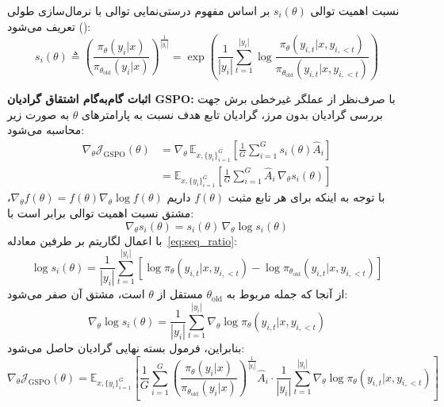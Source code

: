 نسبت اهمیت توالی $s_i(\theta)$ بر اساس مفهوم درستی‌نمایی توالی با نرمال‌سازی طولی () \cite{zheng2023click} تعریف می‌شود:
\begin{equation}
    \label{eq:seq_ratio}
    s_i(\theta) \triangleq \left( \frac{\pi_\theta(y_i|x)}{\pi_{\theta_{\text{old}}}(y_i|x)} \right)^{\frac{1}{|y_i|}} = \exp \left( \frac{1}{|y_i|} \sum_{t=1}^{|y_i|} \log \frac{\pi_\theta(y_{i,t} | x, y_{i,<t})}{\pi_{\theta_{\text{old}}}(y_{i,t} | x, y_{i,<t})} \right)
\end{equation}

\textbf{اثبات گام‌به‌گام اشتقاق گرادیان GSPO:}
با صرف‌نظر از عملگر غیرخطی برش جهت بررسی گرادیان بدون مرز، گرادیان تابع هدف نسبت به پارامترهای $\theta$ به صورت زیر محاسبه می‌شود:
\begin{align}
    \nabla_\theta \mathcal{J}_{\text{GSPO}}(\theta) &= \nabla_\theta \, \mathbb{E}_{x, \{y_i\}_{i=1}^G} \left[ \frac{1}{G} \sum_{i=1}^G s_i(\theta) \hat{A}_i \right] \nonumber \\
    &= \mathbb{E}_{x, \{y_i\}_{i=1}^G} \left[ \frac{1}{G} \sum_{i=1}^G \hat{A}_i \, \nabla_\theta s_i(\theta) \right]
\end{align}
با توجه به اینکه برای هر تابع مثبت $f(\theta)$ داریم $\nabla_\theta f(\theta) = f(\theta) \nabla_\theta \log f(\theta)$، مشتق نسبت اهمیت توالی برابر است با:
\begin{equation}
    \nabla_\theta s_i(\theta) = s_i(\theta) \, \nabla_\theta \log s_i(\theta)
\end{equation}
با اعمال لگاریتم بر طرفین معادله~\eqref{eq:seq_ratio}:
\begin{equation}
    \log s_i(\theta) = \frac{1}{|y_i|} \sum_{t=1}^{|y_i|} \left[ \log \pi_\theta(y_{i,t} | x, y_{i,<t}) - \log \pi_{\theta_{\text{old}}}(y_{i,t} | x, y_{i,<t}) \right]
\end{equation}
از آنجا که جمله مربوط به $\theta_{\text{old}}$ مستقل از $\theta$ است، مشتق آن صفر می‌شود:
\begin{equation}
    \nabla_\theta \log s_i(\theta) = \frac{1}{|y_i|} \sum_{t=1}^{|y_i|} \nabla_\theta \log \pi_\theta(y_{i,t} | x, y_{i,<t})
\end{equation}
بنابراین، فرمول بسته نهایی گرادیان  حاصل می‌شود:
\begin{equation}
    \label{eq:gspo_gradient_final}
    \nabla_\theta \mathcal{J}_{\text{GSPO}}(\theta) = \mathbb{E}_{x, \{y_i\}_{i=1}^G} \left[ \frac{1}{G} \sum_{i=1}^G \left( \frac{\pi_\theta(y_i|x)}{\pi_{\theta_{\text{old}}}(y_i|x)} \right)^{\frac{1}{|y_i|}} \hat{A}_i \cdot \frac{1}{|y_i|} \sum_{t=1}^{|y_i|} \nabla_\theta \log \pi_\theta(y_{i,t} | x, y_{i,<t}) \right]
\end{equation}

